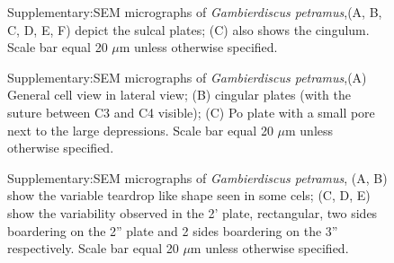 \documentclass[12pt]{article}
\begin{document}
\FloatBarrier 
\begin{figure} 
\caption{Supplementary:SEM micrographs of \emph{Gambierdiscus petramus},(A, B, C, D, E, F) depict the sulcal plates; (C) also shows the cingulum. Scale bar equal 20 $\mu$m unless otherwise specified.} 
\label{fig:sulcSEM}
\end{figure} 
\FloatBarrier

\FloatBarrier 
\begin{figure} 
\caption{Supplementary:SEM micrographs of \emph{Gambierdiscus petramus},(A) General cell view in lateral view; (B) cingular plates (with the suture between C3
and C4 visible); (C) Po plate with a small pore next to the large depressions. Scale bar equal 20 $\mu$m unless otherwise specified.} 
\label{fig:latSEM}
\end{figure} 
\FloatBarrier

\FloatBarrier 
\begin{figure} 
\caption{Supplementary:SEM micrographs of \emph{Gambierdiscus petramus}, (A, B) show the variable teardrop like shape seen in some cels; (C, D, E) show the variability observed in the 2' plate, rectangular, two sides boardering on the 2'' plate and 2 sides boardering on the 3'' respectively. Scale bar equal 20 $\mu$m unless otherwise specified.} 
\label{fig:varSEM}
\end{figure} 
\FloatBarrier
\newpage


\end{document}
